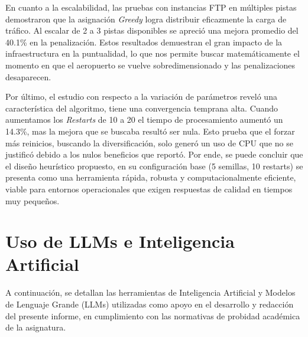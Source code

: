\documentclass[letter, 10pt]{article}
\begin{document}
En cuanto a la escalabilidad, las pruebas con instancias FTP en múltiples pistas demostraron que la asignación \textit{Greedy} logra distribuir eficazmente la carga de tráfico. Al escalar de 2 a 3 pistas disponibles se apreció una mejora promedio del 40.1\% en la penalización. Estos resultados demuestran el gran impacto de la infraestructura en la puntualidad, lo que nos permite buscar matemáticamente el momento en que el aeropuerto se vuelve sobredimensionado y las penalizaciones desaparecen.

Por último, el estudio con respecto a la variación de parámetros reveló una característica del algoritmo, tiene una convergencia temprana alta. Cuando aumentamos los \textit{Restarts} de 10 a 20 el tiempo de procesamiento aumentó un 14.3\%, mas la mejora que se buscaba resultó ser nula. Esto prueba que el forzar más reinicios, buscando la diversificación, solo generó un uso de CPU que no se justificó debido a los nulos beneficios que reportó. Por ende, se puede concluir que el diseño heurístico propuesto, en su configuración base (5 semillas, 10 restarts) se presenta como una herramienta rápida, robusta y computacionalmente eficiente, viable para entornos operacionales que exigen respuestas de calidad en tiempos muy pequeños.

\section{Uso de LLMs e Inteligencia Artificial}
A continuaci\'on, se detallan las herramientas de Inteligencia Artificial y Modelos de Lenguaje Grande (LLMs) utilizadas como apoyo en el desarrollo y redacci\'on del presente informe, en cumplimiento con las normativas de probidad acad\'emica de la asignatura.
\end{document}
